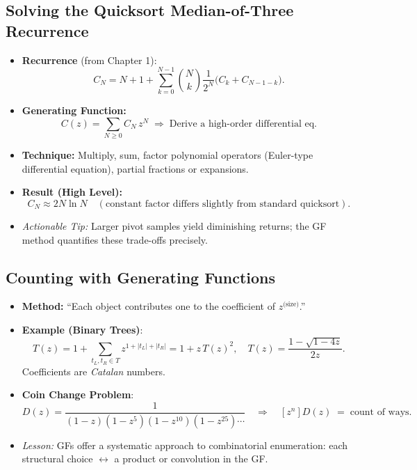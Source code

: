 \documentclass[11pt,letterpaper]{article}
\begin{document}
\subsection{Solving the Quicksort Median-of-Three Recurrence}
\label{sec:quicksort-med3}
\begin{itemize}
  \item \textbf{Recurrence} (from Chapter 1):
    \[
      C_N = N+1 + \sum_{k=0}^{N-1}\binom{N}{k}\frac{1}{2^N}\bigl(C_k + C_{N-1-k}\bigr).
    \]
  \item \textbf{Generating Function:} 
    \[
      C(z)= \sum_{N\ge0} C_N\,z^N 
      \;\Longrightarrow\;\text{Derive a high-order differential eq.}
    \]
  \item \textbf{Technique:} Multiply, sum, factor polynomial operators (Euler-type differential equation), partial fractions or expansions.
  \item \textbf{Result (High Level):} 
    \[
      C_N \approx 2N\ln N \quad(\text{constant factor differs slightly from standard quicksort}).
    \]
  \item \emph{Actionable Tip:} Larger pivot samples yield diminishing returns; the GF method quantifies these trade-offs precisely.
\end{itemize}

\subsection{Counting with Generating Functions}
\begin{itemize}
  \item \textbf{Method:} “Each object contributes one to the coefficient of \(z^{\text{(size)}}\).” 
  \item \textbf{Example (Binary Trees)}: 
    \[
      T(z)=1+\sum_{t_L,t_R\in T}z^{1+|t_L|+|t_R|}
      =1+z\,T(z)^2,
      \quad T(z)=\frac{1-\sqrt{1-4z}}{2z}.
    \]
    Coefficients are \emph{Catalan} numbers.
  \item \textbf{Coin Change Problem}:
    \[
      D(z)=\frac{1}{(1-z)(1-z^5)(1-z^{10})(1-z^{25})\cdots}
      \quad\Longrightarrow\quad[z^n]D(z)\;=\;\text{count of ways}.
    \]
  \item \emph{Lesson:} GFs offer a systematic approach to combinatorial enumeration: each structural choice \(\leftrightarrow\) a product or convolution in the GF.
\end{itemize}

\end{document}

